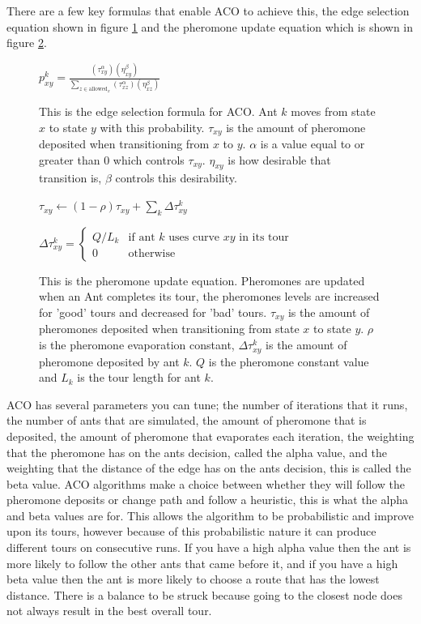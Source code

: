 There are a few key formulas that enable ACO to achieve this, the edge selection equation shown in figure \ref{eq:ACOEdgeselection} and the pheromone update equation which is shown in figure \ref{eq:pheremoneupdate}. 

\begin{figure}[h]
    \centering
    $
    p_{xy}^k =
    \frac
    { (\tau_{xy}^{\alpha}) (\eta_{xy}^{\beta}) }
    { \sum_{z\in \mathrm{allowed}_x} (\tau_{xz}^{\alpha}) (\eta_{xz}^{\beta}) }$
    \caption{This is the edge selection formula for ACO. Ant $k$ moves from state $x$ to state $y$ with this probability. $\tau_{xy}$ is the amount of pheromone deposited when transitioning from $x$ to $y$. $\alpha$ is a value equal to or greater than 0 which controls $\tau_{xy}$. $\eta_{xy}$ is how desirable that transition is, $\beta$ controls this desirability.}
    \label{eq:ACOEdgeselection}
\end{figure}

\begin{figure}[h]
    \centering
    $ \tau_{xy} \leftarrow
    (1-\rho)\tau_{xy} + \sum_{k}\Delta \tau^{k}_{xy}$
    
    $\Delta \tau^{k}_{xy} =
    \begin{cases}
    Q/L_k & \mbox{if ant }k\mbox{ uses curve }xy\mbox{ in its tour} \\
    0 & \mbox{otherwise}
    \end{cases}$
    \caption{This is the pheromone update equation. Pheromones are updated when an Ant completes its tour, the pheromones levels are increased for 'good' tours and decreased for 'bad' tours. $\tau_{xy}$ is the amount of pheromones deposited when transitioning from state $x$ to state $y$. $\rho$ is the pheromone evaporation constant, $\Delta \tau^{k}_{xy}$ is the amount of pheromone deposited by ant $k$. $Q$ is the pheromone constant value and $L_k$ is the tour length for ant $k$.}
    \label{eq:pheremoneupdate}
\end{figure}

ACO has several parameters you can tune; the number of iterations that it runs, the number of ants that are simulated, the amount of pheromone that is deposited, the amount of pheromone that evaporates each iteration, the weighting that the pheromone has on the ants decision, called the alpha value, and the weighting that the distance of the edge has on the ants decision, this is called the beta value. ACO algorithms make a choice between whether they will follow the pheromone deposits or change path and follow a heuristic, this is what the alpha and beta values are for. This allows the algorithm to be probabilistic and improve upon its tours, however because of this probabilistic nature it can produce different tours on consecutive runs. If you have a high alpha value then the ant is more likely to follow the other ants that came before it, and if you have a high beta value then the ant is more likely to choose a route that has the lowest distance. There is a balance to be struck because going to the closest node does not always result in the best overall tour.

